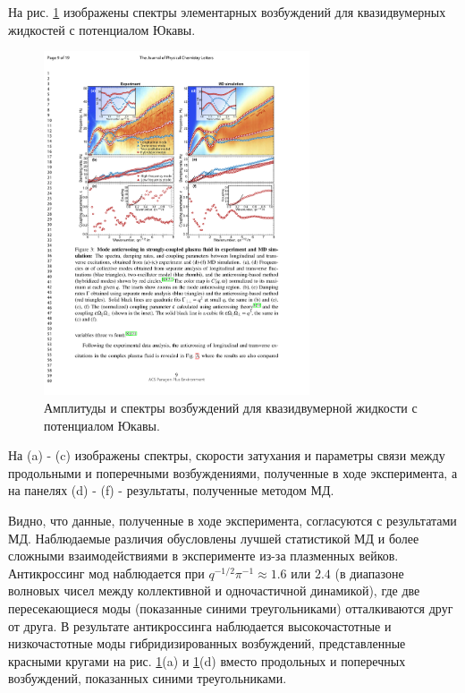 На рис. \ref{PlasmaSp} изображены спектры элементарных возбуждений для квазидвумерных жидкостей с потенциалом Юкавы. 

\begin{figure}[htbp]
    \begin{center}
    \includegraphics[width=0.7\textwidth]{Ris/Plasma_SP_3.pdf}
    \caption{Амплитуды и спектры возбуждений для квазидвумерной жидкости с потенциалом Юкавы. }
    \label{PlasmaSp}
    \end{center}
\end{figure}

На (a) - (c) изображены спектры, скорости затухания и параметры связи между продольными и поперечными возбуждениями, полученные в ходе эксперимента, а на панелях (d) - (f) - результаты, полученные методом МД.

Видно, что данные, полученные в ходе эксперимента, согласуются с результатами МД. Наблюдаемые различия обусловлены лучшей статистикой МД и более сложными взаимодействиями в эксперименте из-за плазменных вейков. Антикроссинг мод наблюдается при $q^{-1/2} \pi^{-1} \approx 1.6$ или $2.4$ (в диапазоне волновых чисел между коллективной и одночастичной динамикой), где две пересекающиеся моды (показанные синими треугольниками) отталкиваются друг от друга. В результате антикроссинга наблюдается высокочастотные и низкочастотные моды гибридизированных возбуждений, представленные красными кругами на рис.  \ref{PlasmaSp}(a) и  \ref{PlasmaSp}(d) вместо продольных и поперечных возбуждений, показанных синими треугольниками.


